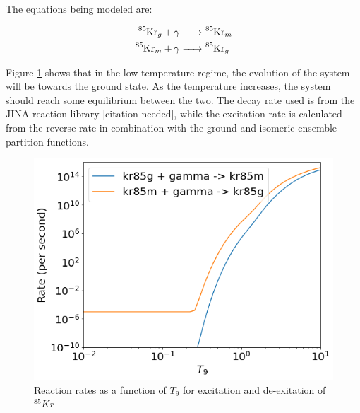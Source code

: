 \documentclass{article}
\begin{document}
The equations being modeled are:

\begin{align*}
    \ce{^85Kr_g + \gamma &-> ^85Kr_m}\\
    \ce{^85Kr_m + \gamma &-> ^85Kr_g}
\end{align*}

Figure \ref{rates} shows that in the low temperature regime, the evolution of the system will be towards the ground state. As the 
temperature increases, the system should reach some equilibrium between the two. The decay rate used is from the JINA reaction 
library [citation needed], while the excitation rate is calculated from the reverse rate in combination with the ground and 
isomeric ensemble partition functions.


\begin{figure}[H]
    \centerline{\includegraphics[scale = 0.5]{images/iso_rates.png}}
    \caption{Reaction rates as a function of $T_{9}$ for excitation and de-exitation of $^{85}Kr$}
    \label{rates}
\end{figure}
\end{document}
